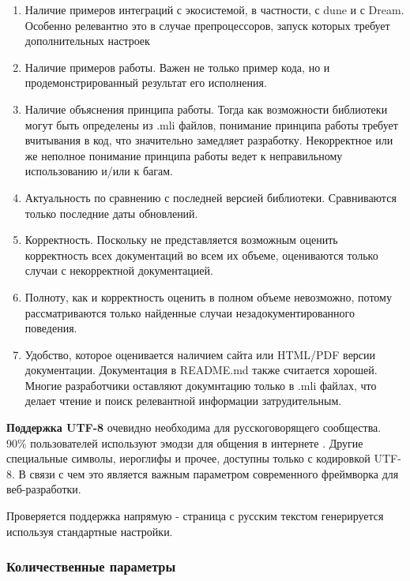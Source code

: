 \begin{enumerate}
    \item Наличие примеров интеграций с экосистемой, в частности, с dune и с Dream. Особенно релевантно это в случае препроцессоров, запуск которых требует дополнительных настроек
    \item Наличие примеров работы. Важен не только пример кода, но и продемонстрированный результат его исполнения.
    \item Наличие объяснения принципа работы. Тогда как возможности библиотеки могут быть определены из .mli файлов, понимание принципа работы требует вчитывания в код, что значительно замедляет разработку. Некорректное или же неполное понимание принципа работы ведет к неправильному использованию и/или к багам.
    \item Актуальность по сравнению с последней версией библиотеки. Сравниваются только последние даты обновлений.
    \item Корректность. Поскольку не представляется возможным оценить корректность всех документаций во всем их объеме, оцениваются только случаи с некорректной документацией.
    \item Полноту, как и корректность оценить в полном объеме невозможно, потому рассматриваются только найденные случаи незадокументированного поведения.
    \item Удобство, которое оценивается наличием сайта или HTML/PDF версии документации. Документация в README.md также считается хорошей. Многие разработчики оставляют докумнтацию только в .mli файлах, что делает чтение и поиск релевантной информации затрудительным.
\end{enumerate}

\textbf{Поддержка UTF-8} очевидно необходима для русскоговорящего сообщества.
90\% пользователей используют эмодзи для общения в интернете \cite{Emoji}.
Другие специальные символы, иероглифы и прочее, доступны только с кодировкой UTF-8.
В связи с чем это является важным параметром современного фреймворка для веб-разработки.

Проверяется поддержка напрямую - страница с русским текстом генерируется используя стандартные настройки.

\subsubsection{Количественные параметры}


